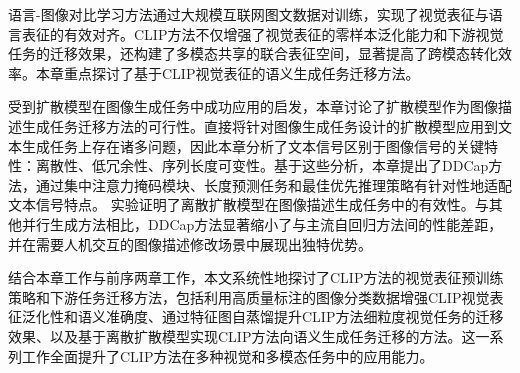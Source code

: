 语言-图像对比学习方法通过大规模互联网图文数据对训练，实现了视觉表征与语言表征的有效对齐。CLIP方法不仅增强了视觉表征的零样本泛化能力和下游视觉任务的迁移效果，还构建了多模态共享的联合表征空间，显著提高了跨模态转化效率。本章重点探讨了基于CLIP视觉表征的语义生成任务迁移方法。

受到扩散模型在图像生成任务中成功应用的启发，本章讨论了扩散模型作为图像描述生成任务迁移方法的可行性。直接将针对图像生成任务设计的扩散模型应用到文本生成任务上存在诸多问题，因此本章分析了文本信号区别于图像信号的关键特性：离散性、低冗余性、序列长度可变性。基于这些分析，本章提出了DDCap方法，通过集中注意力掩码模块、长度预测任务和最佳优先推理策略有针对性地适配文本信号特点。
实验证明了离散扩散模型在图像描述生成任务中的有效性。与其他并行生成方法相比，DDCap方法显著缩小了与主流自回归方法间的性能差距，并在需要人机交互的图像描述修改场景中展现出独特优势。


结合本章工作与前序两章工作，本文系统性地探讨了CLIP方法的视觉表征预训练策略和下游任务迁移方法，包括利用高质量标注的图像分类数据增强CLIP视觉表征泛化性和语义准确度、通过特征图自蒸馏提升CLIP方法细粒度视觉任务的迁移效果、以及基于离散扩散模型实现CLIP方法向语义生成任务迁移的方法。这一系列工作全面提升了CLIP方法在多种视觉和多模态任务中的应用能力。

